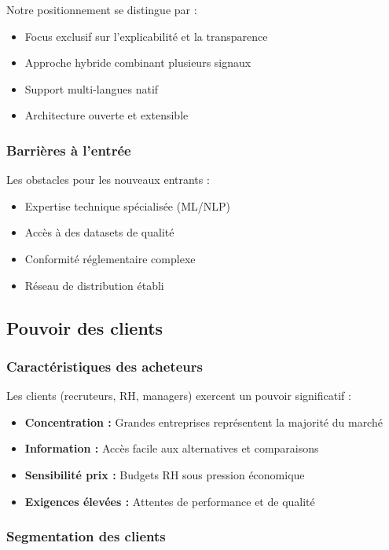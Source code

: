\documentclass[12pt,a4paper]{report}
\begin{document}
Notre positionnement se distingue par :
\begin{itemize}
\item Focus exclusif sur l'explicabilité et la transparence
\item Approche hybride combinant plusieurs signaux
\item Support multi-langues natif
\item Architecture ouverte et extensible
\end{itemize}

\subsubsection{Barrières à l'entrée}

Les obstacles pour les nouveaux entrants :
\begin{itemize}
\item Expertise technique spécialisée (ML/NLP)
\item Accès à des datasets de qualité
\item Conformité réglementaire complexe
\item Réseau de distribution établi
\end{itemize}

\subsection{Pouvoir des clients}

\subsubsection{Caractéristiques des acheteurs}

Les clients (recruteurs, RH, managers) exercent un pouvoir significatif :
\begin{itemize}
\item \textbf{Concentration :} Grandes entreprises représentent la majorité du marché
\item \textbf{Information :} Accès facile aux alternatives et comparaisons
\item \textbf{Sensibilité prix :} Budgets RH sous pression économique
\item \textbf{Exigences élevées :} Attentes de performance et de qualité
\end{itemize}

\subsubsection{ Segmentation des clients}
\end{document}
